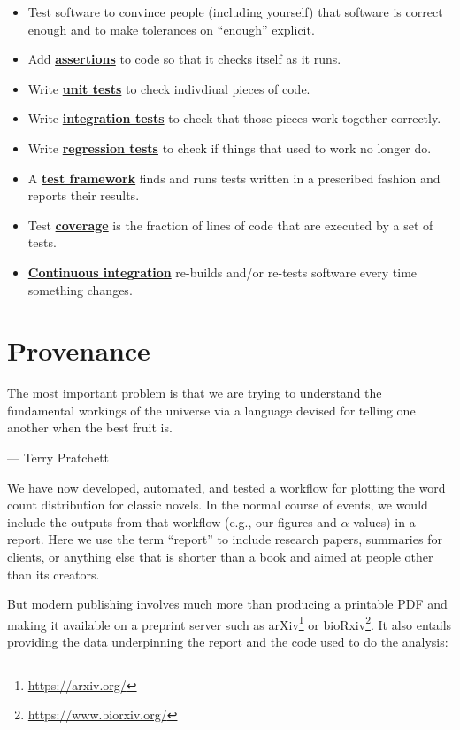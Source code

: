\documentclass[
]{krantz}
\providecommand{\tightlist}{%
  \setlength{\itemsep}{0pt}\setlength{\parskip}{0pt}}
\renewenvironment{quote}{\begin{VF}}{\end{VF}}
\renewcommand{\href}[2]{#2\footnote{\url{#1}}}
\newcommand{\gref}[2]{\hyperlink{#2}{\textbf{#1}}}
\begin{document}
\begin{itemize}
\tightlist
\item
  Test software to convince people (including yourself) that software is correct enough
  and to make tolerances on ``enough'' explicit.
\item
  Add \gref{assertions}{assertion} to code so that it checks itself as it runs.
\item
  Write \gref{unit tests}{unit\_test} to check indivdiual pieces of code.
\item
  Write \gref{integration tests}{integration\_test} to check that those pieces work together correctly.
\item
  Write \gref{regression tests}{regression\_testing} to check if things that used to work no longer do.
\item
  A \gref{test framework}{test\_framework} finds and runs tests written in a prescribed fashion and reports their results.
\item
  Test \gref{coverage}{code\_coverage} is the fraction of lines of code that are executed by a set of tests.
\item
  \gref{Continuous integration}{continuous\_integration} re-builds and/or re-tests software every time something changes.
\end{itemize}

\hypertarget{provenance}{%
\chapter{Provenance}\label{provenance}}

\begin{quote}
The most important problem is that we are trying to understand the fundamental workings of the universe
via a language devised for telling one another when the best fruit is.

--- Terry Pratchett
\end{quote}

We have now developed, automated, and tested
a workflow for plotting the word count distribution for classic novels.
In the normal course of events,
we would include the outputs from that workflow (e.g., our figures and \(\alpha\) values)
in a report.
Here we use the term ``report'' to include research papers,
summaries for clients,
or anything else that is shorter than a book
and aimed at people other than its creators.

But modern publishing involves much more than producing a printable PDF
and making it available on a preprint server such as \href{https://arxiv.org/}{arXiv} or \href{https://www.biorxiv.org/}{bioRxiv}.
It also entails providing the data underpinning the report
and the code used to do the analysis:
\end{document}
